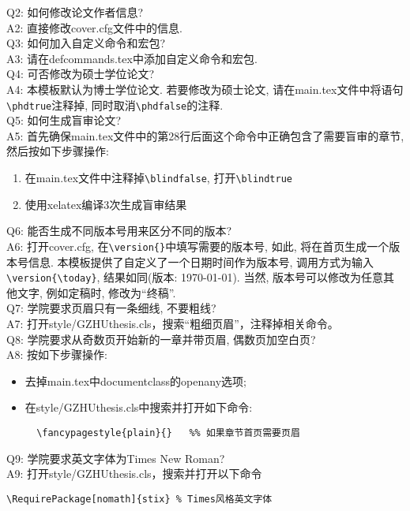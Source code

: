 Q2: 如何修改论文作者信息?\\
A2: 直接修改cover.cfg文件中的信息.\\

Q3: 如何加入自定义命令和宏包?\\
A3: 请在defcommands.tex中添加自定义命令和宏包.\\

Q4: 可否修改为硕士学位论文?\\
A4: 本模板默认为博士学位论文. 若要修改为硕士论文, 请在main.tex文件中将语句\verb|\phdtrue|注释掉, 同时取消\verb|\phdfalse|的注释. \\

Q5: 如何生成盲审论文?\\
A5: 首先确保main.tex文件中的第28行后面这个\verb||命令中正确包含了需要盲审的章节, 然后按如下步骤操作:
\begin{enumerate}
\item 在main.tex文件中注释掉\verb|\blindfalse|, 打开\verb|\blindtrue|
\item 使用xelatex编译3次生成盲审结果
\end{enumerate}

Q6: 能否生成不同版本号用来区分不同的版本?\\
A6: 打开cover.cfg, 在\verb|\version{}|中填写需要的版本号, 如此, 将在首页生成一个版本号信息. 本模板提供了自定义了一个日期时间作为版本号, 调用方式为输入\verb|\version{\today}|, 结果如同(版本: \today). 当然, 版本号可以修改为任意其他文字, 例如定稿时, 修改为“终稿”.\\

Q7: 学院要求页眉只有一条细线, 不要粗线?\\
A7: 打开style/GZHUthesis.cls，搜索“粗细页眉”，注释掉相关命令。\\

Q8: 学院要求从奇数页开始新的一章并带页眉, 偶数页加空白页?\\
A8: 按如下步骤操作:
\begin{itemize}
  \item 去掉main.tex中documentclass的openany选项;
  \item 在style/GZHUthesis.cls中搜索并打开如下命令:
  \begin{verbatim}
  \fancypagestyle{plain}{}   %% 如果章节首页需要页眉
  \end{verbatim}
\end{itemize}

Q9: 学院要求英文字体为Times New Roman?\\
A9: 打开style/GZHUthesis.cls，搜索并打开以下命令
\begin{verbatim}
\RequirePackage[nomath]{stix} % Times风格英文字体
\end{verbatim} 